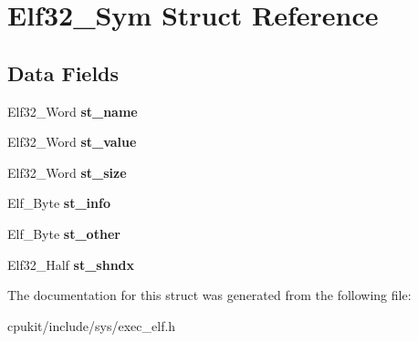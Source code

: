 \hypertarget{structElf32__Sym}{}\section{Elf32\+\_\+\+Sym Struct Reference}
\label{structElf32__Sym}
\subsection*{Data Fields}
\begin{DoxyCompactItemize}
\item 
\mbox{\label{structElf32__Sym_a6a972b30868879f8a1e071e0c45e5031}} 
Elf32\+\_\+\+Word {\bfseries st\+\_\+name}
\item 
\mbox{\label{structElf32__Sym_a9cf27fd6f476a5afa693e1d63da54be4}} 
Elf32\+\_\+\+Word {\bfseries st\+\_\+value}
\item 
\mbox{\label{structElf32__Sym_a1b410e69fecd2610bc7e58d2b0245053}} 
Elf32\+\_\+\+Word {\bfseries st\+\_\+size}
\item 
\mbox{\label{structElf32__Sym_a4727e6390799c92de737997a2ca7c40c}} 
Elf\+\_\+\+Byte {\bfseries st\+\_\+info}
\item 
\mbox{\label{structElf32__Sym_a9b97c2aefb68d7e3ad2ebd0736e286e3}} 
Elf\+\_\+\+Byte {\bfseries st\+\_\+other}
\item 
\mbox{\label{structElf32__Sym_a46e54847ab00fbea62df8ee5dff8dec6}} 
Elf32\+\_\+\+Half {\bfseries st\+\_\+shndx}
\end{DoxyCompactItemize}


The documentation for this struct was generated from the following file\+:\begin{DoxyCompactItemize}
\item 
cpukit/include/sys/exec\+\_\+elf.\+h\end{DoxyCompactItemize}
